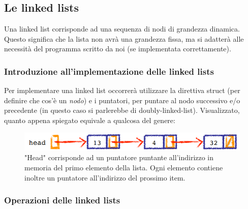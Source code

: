 \documentclass[12pt]{article}
\begin{document}
\subsection{Le linked lists}
\label{ssec:linked_lists}
Una linked list corrisponde ad una sequenza di nodi di grandezza dinamica.
Questo significa che la lista non avrà una grandezza fissa, ma si adatterà alle necessità del programma scritto da noi (se implementata correttamente).

\subsubsection{Introduzione all'implementazione delle linked lists}
\label{sssec:linked_lists_introduction}
Per implementare una linked list occorrerà utilizzare la direttiva struct (per definire che cos'è un \textit{nodo})
e i puntatori, per puntare al nodo successivo e/o precedente (in questo caso si parlerebbe di doubly-linked-list).
Visualizzato, quanto appena spiegato equivale a qualcosa del genere:
\begin{figure}[H]
    \centering
    \includegraphics[width=.9\linewidth,height=.40\textheight,keepaspectratio]{linked_list_visualized.png} %
    \begin{center}
        \caption{\label{fig:} "Head" corrisponde ad un puntatore puntante all'indirizzo in memoria del primo elemento della lista. Ogni elemento contiene inoltre un puntatore all'indirizzo del prossimo item.} %
    \end{center}
\end{figure}

\subsubsection{Operazioni delle linked lists}
\label{sssec:linked_lists_operations}
\end{document}
